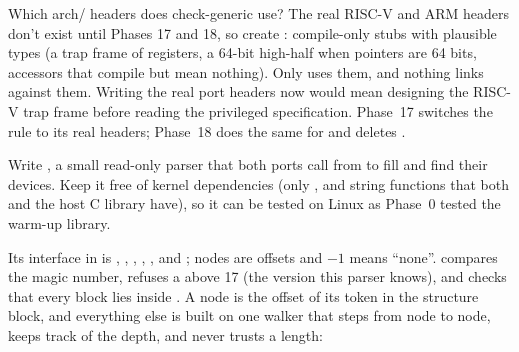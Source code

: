 \documentclass[11pt,a4paper]{article}
\begin{document}
\begin{decisionbox}{Which arch/ headers does check-generic use?}
The real RISC-V and ARM headers don't exist until Phases 17 and 18, so create :
compile-only stubs with plausible types (a trap frame of  registers, a 64-bit high-half
 when pointers are 64 bits, accessors that compile but mean nothing). Only  uses
them, and nothing links against them. Writing the real port headers now would mean designing the RISC-V trap frame
before reading the privileged specification. Phase~17 switches the  rule to its real headers; Phase~18
does the same for  and deletes .
\end{decisionbox}

Write , a small read-only parser that both ports call from  to fill
 and find their devices. Keep it free of kernel dependencies (only ,
 and string functions that both  and the host C library have), so it can be tested
on Linux as Phase~0 tested the warm-up library.

Its interface in  is , ,
, ,
,  and ;
nodes are  offsets and $-1$ means ``none''.  compares the magic number, refuses a
 above 17 (the version this parser knows), and checks that every block lies inside
. A node is the offset of its  token in the structure block, and everything else
is built on one walker that steps from node to node, keeps track of the depth, and never trusts a length:
\end{document}
